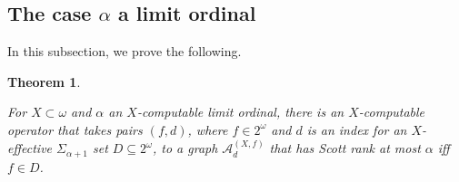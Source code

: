 \documentclass{article}
\newtheorem{thm}{Theorem}[section]
\begin{document}
\subsection{The case $\alpha$ a limit ordinal}

In this subsection, we prove the following.  

\begin{thm}
\label{4.3}

For $X\subset\omega$ and $\alpha$ an $X$-computable limit ordinal, there is an $X$-computable operator that takes pairs $(f,d)$, where $f\in 2^\omega$ and $d$ is an index for an $X$-effective $\Sigma_{\alpha+1}$ set $D\subseteq 2^\omega$, to a graph $\mathcal{A}^{(X,f)}_d$ that has Scott rank at most $\alpha$ iff $f\in D$. 

\end{thm}
\end{document}
